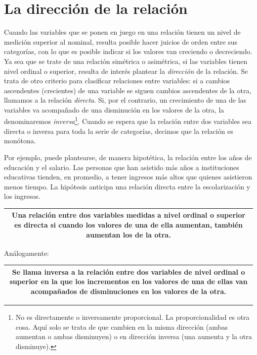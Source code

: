 \documentclass[]{book}
\let\rmarkdownfootnote\footnote%
\def\footnote{\protect\rmarkdownfootnote}
\begin{document}
\hypertarget{la-direcciuxf3n-de-la-relaciuxf3n}{%
\section{La dirección de la relación}\label{la-direcciuxf3n-de-la-relaciuxf3n}}

Cuando las variables que se ponen en juego en una relación tienen un
nivel de medición superior al nominal, resulta posible hacer juicios de orden entre sus categorías, con lo que es posible indicar si los valores
van creciendo o decreciendo. Ya sea que se trate de una relación
simétrica o asimétrica, si las variables tienen nivel ordinal o
superior, resulta de interés plantear la \emph{dirección} de la relación.
Se trata de otro criterio para clasificar relaciones entre variables: si
a cambios ascendentes (crecientes) de una variable se siguen cambios
ascendentes de la otra, llamamos a la relación \emph{directa}. Si, por el
contrario, un crecimiento de una de las variables va acompañado de una
disminución en los valores de la otra, la denominaremos
\emph{inversa}\footnote{No es directamente o inversamente proporcional. La proporcionalidad es otra cosa. Aquí solo se trata de que cambien en la misma dirección (ambas aumentan o ambas disminuyen) o en dirección inversa (una aumenta y la otra disminuye).}. Cuando se espera que la relación entre dos variables
sea directa o inversa para toda la serie de categorías, decimos que la
relación es monótona.

Por ejemplo, puede plantearse, de manera hipotética, la relación entre
los años de educación y el salario. Las personas que han asistido más
años a instituciones educativas tienden, en promedio, a tener ingresos
más altos que quienes asistieron menos tiempo. La hipótesis anticipa una
relación directa entre la escolarización y los ingresos.

\begin{longtable}[]{@{}c@{}}
\toprule
\endhead
\begin{minipage}[t]{0.97\columnwidth}\centering
Una relación entre dos variables medidas a nivel ordinal o superior es \textbf{directa} si cuando los valores de una de ella aumentan, también aumentan los de la otra.\strut
\end{minipage}\tabularnewline
\bottomrule
\end{longtable}

Análogamente:

\begin{longtable}[]{@{}c@{}}
\toprule
\endhead
\begin{minipage}[t]{0.97\columnwidth}\centering
Se llama \textbf{inversa} a la relación entre dos variables de nivel ordinal o superior en la que los incrementos en los valores de una de ellas van acompañados de disminuciones en los valores de la otra.\strut
\end{minipage}\tabularnewline
\bottomrule
\end{longtable}
\end{document}
